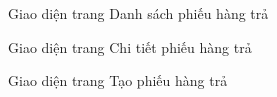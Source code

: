\begin{figure}[H]
    \begin{center}
        \caption{Giao diện trang Danh sách phiếu hàng trả}
        \label{result_danh_sach_hang_tra}
    \end{center}
\end{figure}

\begin{figure}[H]
    \begin{center}
        \caption{Giao diện trang Chi tiết phiếu hàng trả}
        \label{result_chi_tiet_hang_tra}
    \end{center}
\end{figure}

\begin{figure}[H]
    \begin{center}
        \caption{Giao diện trang Tạo phiếu hàng trả}
        \label{result_tao_hang_tra}
    \end{center}
\end{figure}

